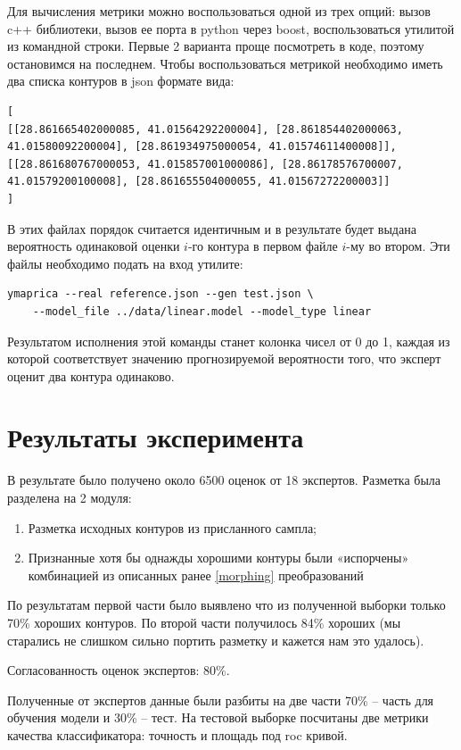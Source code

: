 \documentclass[12pt]{article}
\begin{document}
Для вычисления метрики можно воспользоваться одной из трех опций: вызов c++ библиотеки, вызов ее порта в python через boost, воспользоваться утилитой из командной строки. Первые 2 варианта проще посмотреть в коде, поэтому остановимся на последнем. Чтобы воспользоваться метрикой необходимо иметь два списка контуров в json формате вида:
{\tiny
\begin{verbatim}
[
[[28.861665402000085, 41.01564292200004], [28.861854402000063, 41.01580092200004], [28.861934975000054, 41.01574611400008]],
[[28.861680767000053, 41.015857001000086], [28.86178576700007, 41.01579200100008], [28.861655504000055, 41.01567272200003]]
]
\end{verbatim}
}
В этих файлах порядок считается идентичным и в результате будет выдана вероятность одинаковой оценки $i$-го контура в первом файле $i$-му во втором. Эти файлы необходимо подать на вход утилите:
{\footnotesize
\begin{verbatim}
ymaprica --real reference.json --gen test.json \
    --model_file ../data/linear.model --model_type linear
\end{verbatim}}
Результатом исполнения этой команды станет колонка чисел от 0 до 1, каждая из которой соответствует значению прогнозируемой вероятности того, что эксперт оценит два контура одинаково.

\section{Результаты эксперимента}
\label{experiments}
В результате было получено около 6500 оценок от 18 экспертов.
Разметка была разделена на 2 модуля:
\begin{enumerate}
    \item Разметка исходных контуров из присланного сампла;
    \item Признанные хотя бы однажды хорошими контуры были «испорчены» комбинацией из описанных ранее \ref{morphing} преобразований
\end{enumerate}

По результатам первой части было выявлено что из полученной выборки только 70\% хороших контуров.
По второй части получилось 84\% хороших (мы старались не слишком сильно портить разметку и кажется нам это удалось).

Согласованность оценок экспертов: 80\%.

Полученные от экспертов данные были разбиты на две части 70\% -- часть для обучения модели и 30\% -- тест. На тестовой выборке посчитаны две метрики качества классификатора: точность и площадь под roc кривой.
\end{document}
